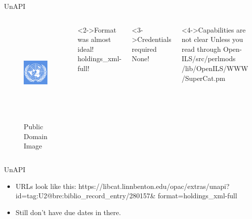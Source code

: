 \documentclass{beamer}
\begin{document}
\begin{frame}{UnAPI}
 
 \begin{columns}
 \begin{figure}
  \begin{center}
   \includegraphics[height=2in]{unapi.png}
   \caption{Public Domain Image}
  \end{center}

 \end{figure}



\begin{block}<2->{Format was almost ideal!}
holdings\_xml-full!
\end{block}
\begin{block}<3->{Credentials required}
None!
\end{block}
\begin{block}<4->{Capabilities are not clear}
Unless you read through Open-ILS/src/perlmods
/lib/OpenILS/WWW
/SuperCat.pm
\end{block}
\end{columns}
 
 
\end{frame}


\begin{frame}{UnAPI}
\begin{itemize}
 \item  URLs look like this:
 https://libcat.linnbenton.edu/opac/extras/unapi?
 id=tag:U2@bre:biblio\_record\_entry/280157\&
 format=holdings\_xml-full
\item Still don't have due dates in there.
\end{itemize}

 
 
\end{frame}
\end{document}
